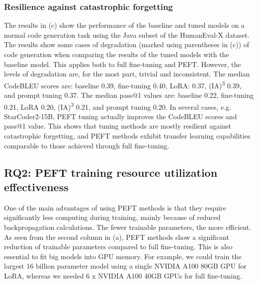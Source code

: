 \documentclass[12pt]{book}
\begin{document}
\subsubsection{Resilience against catastrophic forgetting}
\label{sec:catastrophic-forgetting}
The results in (c) show the performance of the baseline and tuned models on a normal code generation task using the Java subset of the HumanEval-X dataset. The results show some cases of degradation (marked using parentheses in (c)) of code generation when comparing the results of the tuned models with the baseline model. This applies both to full fine-tuning and PEFT. However, the levels of degradation are, for the most part, trivial and inconsistent. The median CodeBLEU scores are: baseline 0.39, fine-tuning 0.40, LoRA: 0.37, (IA)\textsuperscript{3} 0.39, and prompt tuning 0.37. The median pass@1 values are: baseline 0.22, fine-tuning 0.21, LoRA 0.20, (IA)\textsuperscript{3} 0.21, and prompt tuning 0.20. In several cases, e.g. StarCoder2-15B, PEFT tuning actually improves the CodeBLEU scores and pass@1 value. This shows that tuning methods are mostly resilient against catastrophic forgetting, and PEFT methods exhibit transfer learning capabilities comparable to those achieved through full fine-tuning.

\vspace{1em}
\noindent{}

\subsection{RQ2: PEFT training resource utilization effectiveness}
One of the main advantages of using PEFT methods is that they require significantly less computing during training, mainly because of reduced backpropagation calculations. The fewer trainable parameters, the more efficient. As seen from the second column in (a), PEFT methods show a significant reduction of trainable parameters compared to full fine-tuning. This is also essential to fit big models into GPU memory. For example, we could train the largest 16 billion parameter model using a single NVIDIA A100 80GB GPU for LoRA, whereas we needed 6 x NVIDIA A100 40GB GPUs for full fine-tuning.
\end{document}
